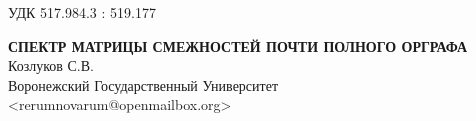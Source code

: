 \documentclass[11pt]{article}
\begin{document}
\setcounter{thm}{0}
\small УДК 517.984.3 : 519.177

\begin{center}
\textbf{СПЕКТР МАТРИЦЫ СМЕЖНОСТЕЙ ПОЧТИ ПОЛНОГО ОРГРАФА}\\
\small{Козлуков С.В.} \\
\small{Воронежский Государственный Университет} \\
\small{<rerumnovarum@openmailbox.org>} \\
\end{center}



\end{document}
